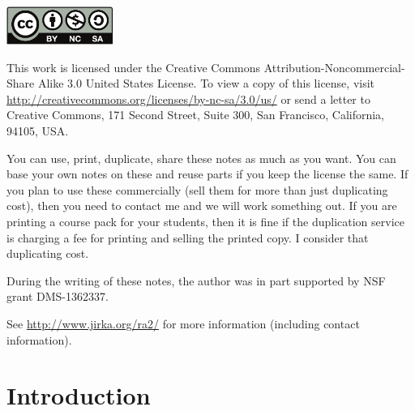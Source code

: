 \documentclass[12pt]{book}
\theoremstyle{plain}
\theoremstyle{remark}
\theoremstyle{definition}
\theoremstyle{exercise}
\theoremstyle{example}
\begin{document}
\bigskip

\noindent
\includegraphics[width=1.38in]{license}

\bigskip

\noindent
This work is licensed under the Creative Commons
Attribution-Non\-commercial-Share Alike 3.0 United States License. To view a
copy of this license, visit
\url{http://creativecommons.org/licenses/by-nc-sa/3.0/us/} or send a letter to
Creative Commons, 171 Second Street, Suite 300, San Francisco, California,
94105, USA.

\bigskip

\noindent
You can use, print, duplicate, share these notes as much as you want.  You can
base your own notes on these and reuse parts if you keep the license the
same.  If you plan to use these commercially (sell them for more than just
duplicating cost), then you need to contact me and we will work something out.
If you are printing a course pack for your students, then it is fine if the 
duplication service is charging a fee for printing and selling the printed
copy.  I consider that duplicating cost.

\bigskip

\noindent
During the writing of these notes, 
the author was in part supported by NSF grant DMS-1362337.

\bigskip

\noindent
See \url{http://www.jirka.org/ra2/} for more information
(including contact information).



\tableofcontents
{}

\newpage


\chapter*{Introduction}
\end{document}
